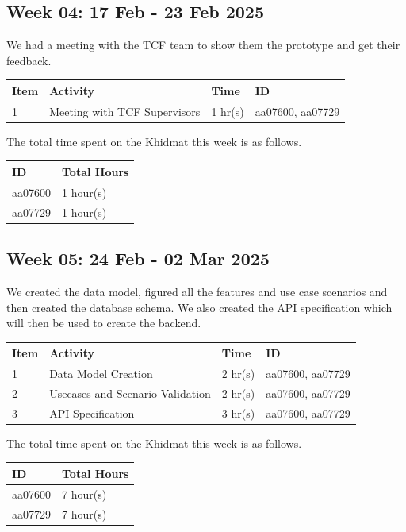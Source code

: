 \documentclass[12pt,a4paper]{article}
\begin{document}
\newpage

\subsection{Week 04: 17 Feb - 23 Feb 2025}
We had a meeting with the TCF team to show them the prototype and get their feedback.

\begin{center}
    \bigskip
    \begin{tabular}{|l|l|l|l|}
        \hline
        Item 	& Activity & Time & ID \\\hline\hline
        1	& Meeting with TCF Supervisors & 1 hr(s) & aa07600, aa07729 \\\hline
    \end{tabular}

    \bigskip
    The total time spent on the Khidmat this week is as follows.

    \bigskip
    \begin{tabular}{|l|l|}
        \hline
        ID & Total Hours\\\hline\hline
        aa07600 & 1 hour(s)\\\hline
        aa07729 & 1 hour(s)\\\hline
    \end{tabular}
\end{center}

\newpage

\subsection{Week 05: 24 Feb - 02 Mar 2025}
We created the data model, figured all the features and use case scenarios and then created the database schema. We also created the API specification which will then be used to create the backend.

\begin{center}
    \bigskip
    \begin{tabular}{|l|l|l|l|}
        \hline
        Item 	& Activity & Time & ID \\\hline\hline
        1	& Data Model Creation & 2 hr(s) & aa07600, aa07729 \\\hline
        2	& Usecases and Scenario Validation & 2 hr(s) & aa07600, aa07729 \\\hline
        3	& API Specification & 3 hr(s) & aa07600, aa07729 \\\hline
    \end{tabular}

    \bigskip
    The total time spent on the Khidmat this week is as follows.

    \bigskip
    \begin{tabular}{|l|l|}
        \hline
        ID & Total Hours\\\hline\hline
        aa07600 & 7 hour(s)\\\hline
        aa07729 & 7 hour(s)\\\hline
    \end{tabular}
\end{center}
\end{document}
